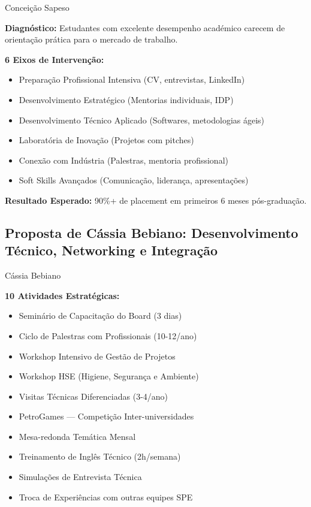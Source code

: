 \documentclass[12pt,a4paper,oneside]{article}
\begin{document}
\begin{proposalbox}{Conceição Sapeso}

\textbf{Diagnóstico:} Estudantes com excelente desempenho académico carecem de orientação prática para o mercado de trabalho.

\medskip

\textbf{6 Eixos de Intervenção:}

\begin{itemize}[label={\color{spe-secondary}▸}]
  \item Preparação Profissional Intensiva (CV, entrevistas, LinkedIn)
  \item Desenvolvimento Estratégico (Mentorias individuais, IDP)
  \item Desenvolvimento Técnico Aplicado (Softwares, metodologias ágeis)
  \item Laboratória de Inovação (Projetos com pitches)
  \item Conexão com Indústria (Palestras, mentoria profissional)
  \item Soft Skills Avançados (Comunicação, liderança, apresentações)
\end{itemize}

\textbf{Resultado Esperado:} 90\%+ de placement em primeiros 6 meses pós-graduação.

\end{proposalbox}

\vspace{1.2cm}

\subsection{Proposta de Cássia Bebiano: Desenvolvimento Técnico, Networking e Integração}

\begin{proposalbox}{Cássia Bebiano}

\textbf{10 Atividades Estratégicas:}

\begin{itemize}[label={\color{spe-secondary}▸}]
  \item Seminário de Capacitação do Board (3 dias)
  \item Ciclo de Palestras com Profissionais (10-12/ano)
  \item Workshop Intensivo de Gestão de Projetos
  \item Workshop HSE (Higiene, Segurança e Ambiente)
  \item Visitas Técnicas Diferenciadas (3-4/ano)
  \item PetroGames — Competição Inter-universidades
  \item Mesa-redonda Temática Mensal
  \item Treinamento de Inglês Técnico (2h/semana)
  \item Simulações de Entrevista Técnica
  \item Troca de Experiências com outras equipes SPE
\end{itemize}

\end{proposalbox}
\end{document}
